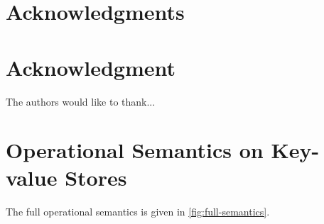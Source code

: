 \documentclass[conference,compsoc]{IEEEtran}
\newcommand{\RootPath}{.}
\begin{document}
  \section*{Acknowledgments}
\else
  \section*{Acknowledgment}
\fi
The authors would like to thank...

  


\newpage
\onecolumn
\appendices

\section{Operational Semantics on Key-value Stores}

\label{sec:full-semantics}
The full operational semantics is given in \cref{fig:full-semantics}.







\end{document}
